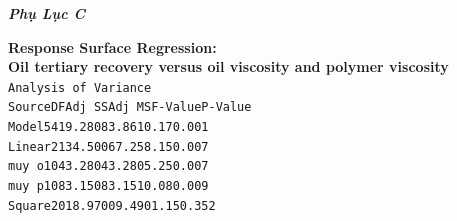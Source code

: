 \documentclass[12pt,a4paper]{article}
\newcommand{\code}[1]{\texttt{#1}}
\begin{document}
\newpage
\noindent
\textit{\textbf{\LARGE Phụ Lục C}}\\
\noindent
\textbf{Response Surface Regression:\\
Oil tertiary recovery versus oil viscosity and polymer viscosity}\\
\newline
\code{Analysis of Variance}\\
\newline
\code{Source}\hspace*{3cm}\code{DF}\hspace*{1cm}\code{Adj SS}\hspace*{1cm}\code{Adj MS}\hspace*{1cm}\code{F-Value}\hspace*{1cm}\code{P-Value}\\
\code{Model}\hspace*{3.5cm}\code{5}\hspace*{1cm}\code{419.28}\hspace*{1cm}\code{083.86}\hspace*{1.5cm}\code{10.17}\hspace*{1.4cm}\code{0.001}\\
\hspace*{0.5cm}\code{Linear}\hspace*{2.75cm}\code{2}\hspace*{1cm}\code{134.50}\hspace*{1cm}\code{067.25}\hspace*{1.75cm}\code{8.15}\hspace*{1.4cm}\code{0.007}\\
\hspace*{1cm}\code{muy o}\hspace*{2.5cm}\code{1}\hspace*{1cm}\code{043.28}\hspace*{1cm}\code{043.28}\hspace*{1.5cm}\code{05.25}\hspace*{1.4cm}\code{0.007}\\
\hspace*{1cm}\code{muy p}\hspace*{2.5cm}\code{1}\hspace*{1cm}\code{083.15}\hspace*{1cm}\code{083.15}\hspace*{1.5cm}\code{10.08}\hspace*{1.4cm}\code{0.009}\\
\hspace*{0.5cm}\code{Square}\hspace*{2.75cm}\code{2}\hspace*{1cm}\code{018.97}\hspace*{1cm}\code{009.49}\hspace*{1.5cm}\code{01.15}\hspace*{1.4cm}\code{0.352}\\
\end{document}
